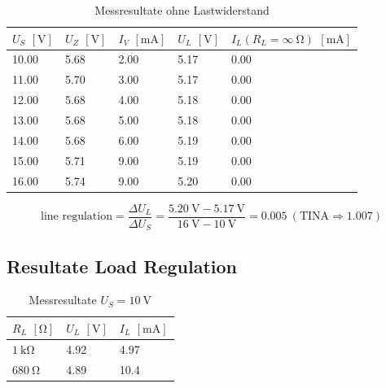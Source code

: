 \documentclass[../main.tex]{subfiles}
\begin{document}
\begin{table}[h]
\renewcommand{\arraystretch}{1.3}
\centering
\begin{tabular}{l|llll}
\textbf{$U_S$} $[\si{\volt}]$ & \textbf{$U_Z$} $[\si{\volt}]$ & \textbf{$I_V$} $[\si{\milli\ampere}]$ & \textbf{$U_L$} $[\si{\volt}]$ & \textbf{$I_L (R_L = \infty\ \si{\ohm})$} $[\si{\milli\ampere}]$\\  \hline
10.00       & 5.68      & 2.00        & 5.17        & 0.00                               \\
11.00       & 5.70      & 3.00        & 5.17        & 0.00                               \\
12.00       & 5.68      & 4.00        & 5.18        & 0.00                               \\
13.00       & 5.68      & 5.00        & 5.18        & 0.00                               \\
14.00       & 5.68      & 6.00        & 5.19        & 0.00                               \\
15.00       & 5.71      & 9.00        & 5.19        & 0.00                               \\
16.00       & 5.74      & 9.00        & 5.20        & 0.00                              
\end{tabular}
\caption{Messresultate ohne Lastwiderstand}
\label{tab:result_task2_line_reg_no_load}
\end{table}

\begin{equation}
    \text{line regulation} = \frac{\Delta U_{L}}{\Delta U_{S}} = \frac{\SI{5.20}{\volt}-\SI{5.17}{\volt}}{\SI{16}{\volt} - \SI{10}{\volt}} = 0.005 \ (\text{TINA} \Rightarrow 1.007)
    \label{equ:task2_line_reg_infty}
\end{equation}

\subsection{Resultate Load Regulation}

\begin{table}[h]
\renewcommand{\arraystretch}{1.3}
\centering
\begin{tabular}{l|ll}
\textbf{$R_L$} $[\si{\ohm}]$ & \textbf{$U_L$} $[\si{\volt}]$ & \textbf{$I_L$} $[\si{\milli\ampere}]$ \\ \hline
\textbf{$\SI{1}{\kilo\ohm}$}    & 4.92  & 4.97    \\
\textbf{$\SI{680}{\ohm}$}       & 4.89  & 10.4  
\end{tabular}
\caption{Messresultate $U_S = \SI{10}{\volt}$}
\label{tab:result_task2_load_reg_10V}
\end{table}
\end{document}
